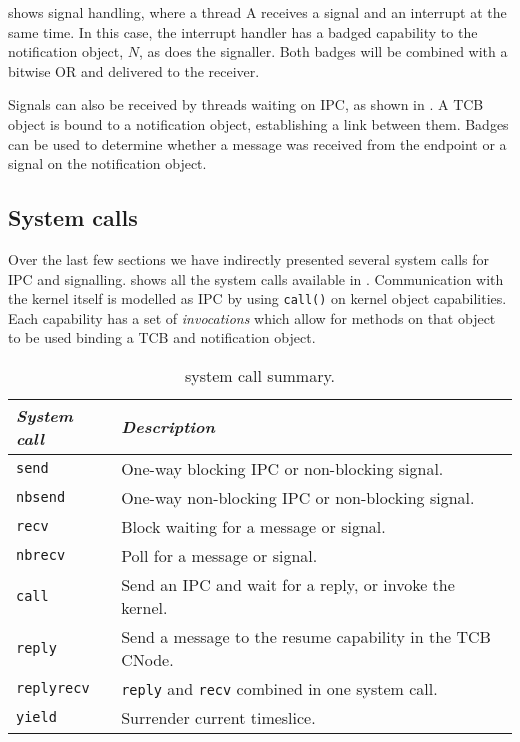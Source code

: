  shows signal handling, where a thread A receives a signal and an interrupt at the
same time. In this case, the interrupt handler has a badged capability to the notification object,
$N$, as does the signaller. Both badges will be combined with a bitwise OR and delivered to the
receiver.

Signals can also be received by threads waiting on \gls{IPC}, as shown in . A
\gls{TCB} object is bound to a notification object, establishing a link between them. Badges can be
used to determine whether a message was received from the endpoint or a signal on the notification object.

\subsection{System calls}

Over the last few sections we have indirectly presented several system calls for \gls{IPC} and
signalling.  shows all the system calls available in \selfour. Communication
with the kernel itself is modelled as \gls{IPC} by using \texttt{call()} on kernel object
capabilities. Each capability has a set of \emph{invocations} which allow for methods on that object
to be used \eg binding a \gls{TCB} and notification object.

\begin{table} 
    \centering
    \begin{tabular}{lp{}}\toprule
        \emph{System call} & \emph{Description} \\\midrule
        \texttt{send}      & One-way blocking \gls{IPC} or non-blocking signal.\\
        \texttt{nbsend}    & One-way non-blocking \gls{IPC} or non-blocking signal.\\
        \texttt{recv}      & Block waiting for a message or signal. \\
        \texttt{nbrecv}    & Poll for a message or signal. \\
        \texttt{call}      & Send an IPC and wait for a reply, or invoke the kernel. \\
        \texttt{reply}     & Send a message to the resume capability in the TCB CNode.\\
        \texttt{replyrecv} & \texttt{reply} and \texttt{recv} combined in one system call.\\
        \texttt{yield}     & Surrender current timeslice. \\
        \bottomrule
    \end{tabular}
    \caption{\selfour system call summary.}
    \label{t:system-calls}
\end{table}

